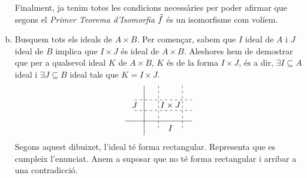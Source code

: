 \documentclass[../main.tex]{subfiles}
\begin{document}
\begin{sol}
\begin{enumerate}[(a)]
    Finalment, ja tenim totes les condicions necessàries per poder afirmar que segons el \textit{Primer Teorema d'Isomorfia} $\Tilde{f}$ és un isomorfisme com volíem.
    
    \item Busquem tots els ideals de $A\times B$. Per començar, sabem que $I$ ideal de $A$ i $J$ ideal de $B$ implica que $I\times J$ és ideal de $A\times B$. Aleshores hem de demostrar que per a qualsevol ideal $K$ de $A\times B$, $K$ és de la forma $I\times J$, és a dir, $\exists I\subseteq A$ ideal i $\exists J\subseteq B$ ideal tals que $K=I\times J$.
    \begin{equation}
        \notag
        \begin{tikzpicture}[x=.20cm,y=.15cm]
            \draw (-4,0) -- (10,0);
            \draw (0,-4) -- (0,10);
            \draw[dashed] (3,-2) -- (3,10);
            \draw[dashed] (8,-2) -- (8,10);
            \draw[dashed] (-2,3) -- (10,3);
            \draw[dashed] (-2,6) -- (10,6);
            \node at (5.5,4.5) {$I\times J$};
            \node at (5.5,-2) {$I$};
            \node at (-2,4.5) {$J$};
        \end{tikzpicture}
    \end{equation}
    Segons aquest dibuixet, l'ideal té forma rectangular. Representa que es cumpleix l'enunciat. Anem a suposar que no té forma rectangular i arribar a una contradicció.
    

\end{enumerate}
\end{sol}
\end{document}
